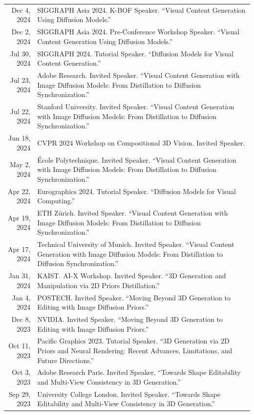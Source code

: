 \documentclass[letterpaper,10pt]{article} %
\begin{document}
\begin{xltabular}{\textwidth}{r|X}
Dec 4, 2024 & SIGGRAPH Asia 2024. K-BOF Speaker. ``Visual Content Generation Using Diffusion Models.''\\
Dec 2, 2024 & SIGGRAPH Asia 2024. Pre-Conference Workshop Speaker. ``Visual Content Generation Using Diffusion Models.''\\
Jul 30, 2024 & SIGGRAPH 2024. Tutorial Speaker. ``Diffusion Models for Visual Content Generation.''\\
Jul 23, 2024 & Adobe Research. Invited Speaker. ``Visual Content Generation with Image Diffusion Models: From Distillation to Diffusion Synchronization.''\\
Jul 22, 2024 & Stanford University. Invited Speaker. ``Visual Content Generation with Image Diffusion Models: From Distillation to Diffusion Synchronization.''\\
Jun 18, 2024 & CVPR 2024 Workshop on Compositional 3D Vision. Invited Speaker.\\
May 2, 2024 & \'Ecole Polytechnique. Invited Speaker. ``Visual Content Generation with Image Diffusion Models: From Distillation to Diffusion Synchronization.''\\
Apr 22, 2024 & Eurographics 2024. Tutorial Speaker. ``Diffusion Models for Visual Computing.''\\
Apr 19, 2024 & ETH Z\"urich. Invited Speaker. ``Visual Content Generation with Image Diffusion Models: From Distillation to Diffusion Synchronization.''\\
Apr 17, 2024 & Technical University of Munich. Invited Speaker. ``Visual Content Generation with Image Diffusion Models: From Distillation to Diffusion Synchronization.''\\
Jan 31, 2024 & KAIST. AI-X Workshop. Invited Speaker. ``3D Generation and Manipulation via 2D Priors Distillation.''\\
Jan 4, 2024 & POSTECH. Invited Speaker. ``Moving Beyond 3D Generation to Editing with Image Diffusion Priors.''\\
Dec 8, 2023 & NVIDIA. Invited Speaker. ``Moving Beyond 3D Generation to Editing with Image Diffusion Priors.''\\
Oct 11, 2023 & Pacific Graphics 2023. Tutorial Speaker. ``3D Generation via 2D Priors and Neural Rendering: Recent Advances, Limitations, and Future Directions.''\\
Oct 3, 2023 & Adobe Research Paris. Invited Speaker. ``Towards Shape Editability and Multi-View Consistency in 3D Generation.''\\
Sep 29, 2023 & University College London. Invited Speaker. ``Towards Shape Editability and Multi-View Consistency in 3D Generation.''\\

\end{xltabular}
\end{document}
